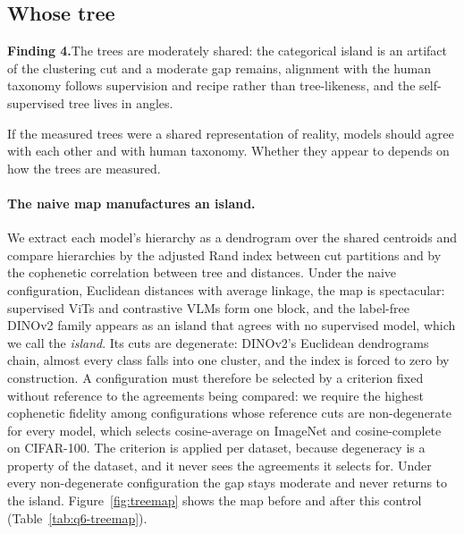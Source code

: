 \documentclass{article}
\theoremstyle{definition}
\begin{document}
\subsection{Whose tree}
\label{sec:content}

\begin{shaded}
\textbf{Finding 4.}\quad The trees are moderately shared: the categorical island is an artifact of the clustering cut and a moderate gap remains, alignment with the human taxonomy follows supervision and recipe rather than tree-likeness, and the self-supervised tree lives in angles.
\end{shaded}
If the measured trees were a shared representation of reality, models should agree with each other and with human taxonomy. Whether they appear to depends on how the trees are measured.

\paragraph{The naive map manufactures an island.} We extract each model's hierarchy as a dendrogram over the shared centroids and compare hierarchies by the adjusted Rand index between cut partitions and by the cophenetic correlation between tree and distances. Under the naive configuration, Euclidean distances with average linkage, the map is spectacular: supervised ViTs and contrastive VLMs form one block, and the label-free DINOv2 family appears as an island that agrees with no supervised model, which we call the \emph{island}. Its cuts are degenerate: DINOv2's Euclidean dendrograms chain, almost every class falls into one cluster, and the index is forced to zero by construction. A configuration must therefore be selected by a criterion fixed without reference to the agreements being compared: we require the highest cophenetic fidelity among configurations whose reference cuts are non-degenerate for every model, which selects cosine-average on ImageNet and cosine-complete on CIFAR-100. The criterion is applied per dataset, because degeneracy is a property of the dataset, and it never sees the agreements it selects for. Under every non-degenerate configuration the gap stays moderate and never returns to the island. Figure~\ref{fig:treemap} shows the map before and after this control (Table~\ref{tab:q6-treemap}). %
\end{document}
